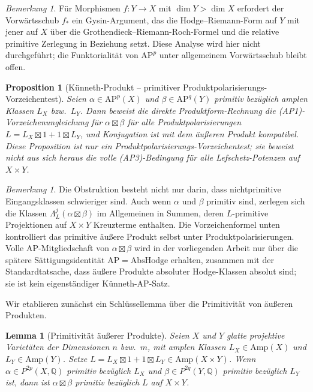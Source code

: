 \documentclass[aps,prd,twocolumn,superscriptaddress,nofootinbib]{revtex4-2}
\newtheorem{proposition}[theorem]{Proposition}
\newtheorem{lemma}[theorem]{Lemma}
\theoremstyle{definition}
\theoremstyle{remark}
\newtheorem{remark}[theorem]{Bemerkung}
\begin{document}
\begin{remark}
Für Morphismen $f: Y \to X$ mit $\dim Y > \dim X$ erfordert der Vorwärtsschub $f_*$ ein Gysin-Argument, das die Hodge--Riemann-Form auf $Y$ mit jener auf $X$ über die Grothendieck--Riemann-Roch-Formel und die relative primitive Zerlegung in Beziehung setzt. Diese Analyse wird hier nicht durchgeführt; die Funktorialität von $\mathrm{AP}^p$ unter allgemeinem Vorwärtsschub bleibt offen.
\end{remark}

\begin{proposition}[Künneth-Produkt -- primitiver Produktpolarisierungs-Vorzeichentest]
\label{prop:kunneth}
Seien $\alpha \in \mathrm{AP}^p(X)$ und $\beta \in \mathrm{AP}^q(Y)$ primitiv bezüglich amplen Klassen $L_X$ bzw.\ $L_Y$. Dann beweist die direkte Produktform-Rechnung die (AP1)-Vorzeichenungleichung für $\alpha \boxtimes \beta$ für alle Produktpolarisierungen $L = L_X \boxtimes 1 + 1 \boxtimes L_Y$, und Konjugation ist mit dem äußeren Produkt kompatibel. Diese Proposition ist nur ein Produktpolarisierungs-Vorzeichentest; sie beweist nicht aus sich heraus die volle (AP3)-Bedingung für alle Lefschetz-Potenzen auf $X\times Y$.
\end{proposition}

\begin{remark}
Die Obstruktion besteht nicht nur darin, dass nichtprimitive Eingangsklassen schwieriger sind. Auch wenn $\alpha$ und $\beta$ primitiv sind, zerlegen sich die Klassen $\Lambda_L^j(\alpha\boxtimes\beta)$ im Allgemeinen in Summen, deren $L$-primitive Projektionen auf $X\times Y$ Kreuzterme enthalten. Die Vorzeichenformel unten kontrolliert das primitive äußere Produkt selbst unter Produktpolarisierungen. Volle AP-Mitgliedschaft von $\alpha\boxtimes\beta$ wird in der vorliegenden Arbeit nur über die spätere Sättigungsidentität $\mathrm{AP}=\mathrm{AbsHodge}$ erhalten, zusammen mit der Standardtatsache, dass äußere Produkte absoluter Hodge-Klassen absolut sind; sie ist kein eigenständiger Künneth-AP-Satz.
\end{remark}

Wir etablieren zunächst ein Schlüssellemma über die Primitivität von äußeren Produkten.

\begin{lemma}[Primitivität äußerer Produkte]
\label{lem:primitive_product}
Seien $X$ und $Y$ glatte projektive Varietäten der Dimensionen $n$ bzw.\ $m$, mit amplen Klassen $L_X \in \mathrm{Amp}(X)$ und $L_Y \in \mathrm{Amp}(Y)$. Setze $L = L_X \boxtimes 1 + 1 \boxtimes L_Y \in \mathrm{Amp}(X \times Y)$. Wenn $\alpha \in P^{2p}(X, \mathbb{Q})$ primitiv bezüglich $L_X$ und $\beta \in P^{2q}(Y, \mathbb{Q})$ primitiv bezüglich $L_Y$ ist, dann ist $\alpha \boxtimes \beta$ primitiv bezüglich $L$ auf $X \times Y$.
\end{lemma}
\end{document}
